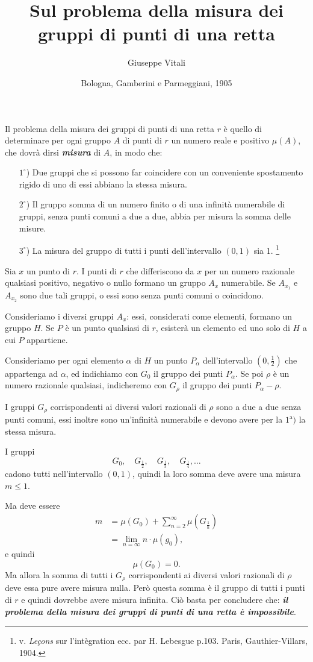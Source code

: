 \documentclass{article}
\title{Sul problema della misura dei gruppi di punti di una retta}
\author{Giuseppe Vitali}
\date{\small Bologna, Gamberini e Parmeggiani, 1905}
\begin{document}
\maketitle

Il problema della misura dei gruppi di punti di una retta $r$ è quello di determinare per ogni gruppo $A$ di punti di $r$ un numero reale e positivo $\mu(A)$, che dovrà dirsi \emph{\bfseries misura} di $A$, in modo che:

\begin{itemize}
	\item[$1^\circ$)] Due gruppi che si possono far coincidere con un conveniente spostamento rigido di uno di essi abbiano la stessa misura.
	\item[$2^\circ$)] Il gruppo somma di un numero finito o di una infinità numerabile di gruppi, senza punti comuni a due a due, abbia per misura la somma delle misure.
	\item[$3^\circ$)] La misura del gruppo di tutti i punti dell'intervallo $(0,1)$ sia 1. \footnote{ v. {\em Le\c cons} sur l'int\`egration ecc. par H. Lebesgue p.103. Paris, Gauthier-Villars, 1904.}
\end{itemize}

Sia $x$ un punto di $r$. I punti di $r$ che differiscono da $x$ per un numero razionale qualsiasi positivo, negativo o nullo formano un gruppo $A_x$ numerabile. Se $A_{x_1}$ e $A_{x_2}$ sono due tali gruppi, o essi sono senza punti comuni o coincidono.

Consideriamo i diversi gruppi $A_x$: essi, considerati come elementi, formano un gruppo $H$. Se $P$ è un punto qualsiasi di $r$, esisterà un elemento ed uno solo di $H$ a cui $P$ appartiene.

Consideriamo per ogni elemento $\alpha$ di $H$ un punto $P_\alpha$ dell'intervallo $(0,\frac12)$ che appartenga ad $\alpha$, ed indichiamo con $G_0$ il gruppo dei punti $P_\alpha$. Se poi $\rho$ è un numero razionale qualsiasi, indicheremo con $G_\rho$ il gruppo dei punti $P_\alpha-\rho$.

I gruppi $G_\rho$ corrispondenti ai diversi valori razionali di $\rho$ sono a due a due senza punti comuni, essi inoltre sono un'infinità numerabile e devono avere per la $1^\textrm{a})$ la stessa misura.

I gruppi
\[
	G_0, \quad G_{\frac12}, \quad G_{\frac13}, \quad G_{\frac14}, \dots
\]
cadono tutti nell'intervallo $(0,1)$, quindi la loro somma deve avere una misura $m\leq1$.

Ma deve essere
\begin{align*}
	m &= \mu(G_0) + \sum_{n=2}^\infty \mu\left(G_{\frac1n}\right) \\
		&= \lim_{n=\infty} n\cdot\mu(g_0),
\end{align*}
e quindi
\[
	\mu(G_0)=0.
\]
Ma allora la somma di tutti i $G_\rho$ corrispondenti ai diversi valori razionali di $\rho$ deve essa pure avere misura nulla. Però questa somma è il gruppo di tutti i punti di $r$ e quindi dovrebbe avere misura infinita. Ciò basta per concludere che: \emph{\bfseries il problema della misura dei gruppi di punti di una retta è impossibile}.
\end{document}
